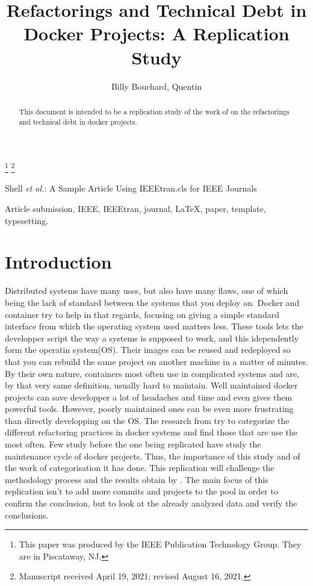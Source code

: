 \documentclass[lettersize,journal]{IEEEtran}
\begin{document}
\title{Refactorings and Technical Debt in Docker Projects: A Replication Study}

\author{Billy Bouchard, Quentin }
\thanks{This paper was produced by the IEEE Publication Technology Group. They are in Piscataway, NJ.}%
\thanks{Manuscript received April 19, 2021; revised August 16, 2021.}

%
{Shell \MakeLowercase{\textit{et al.}}: A Sample Article Using IEEEtran.cls for IEEE Journals}

\maketitle

\begin{abstract}
This document is intended to be a replication study of the work of \cite{1} on the refactorings and technical debt in docker projects.
\end{abstract}

\begin{IEEEkeywords}
Article submission, IEEE, IEEEtran, journal, \LaTeX, paper, template, typesetting.
\end{IEEEkeywords}

\section{Introduction}
Distributed systems have many uses, but also have many flaws, one of which being the lack of standard between the systems that you deploy on.
Docker and container try to help in that regards, focusing on giving a simple standard interface from which the operating system used matters less.
These tools lets the developper script the way a systems is supposed to work, and this idependently form the operatin system(OS).
Their images can be reused and redeployed so that you can rebuild the same project on another machine in a matter of minutes.
By their own nature, containers most often use in complicated systems and are, by that very same definition, usually hard to maintain.
Well maintained docker projects can save developper a lot of headaches and time and even gives them powerful tools.
However, poorly maintained ones can be even more frustrating than directly developping on the OS.
The research from \cite{1} try to categorize the different refactoring practices in docker systems and find those that are use the most often.
Few study before the one being replicated have study the maintenance cycle of docker projects.
Thus, the importance of this study and of the work of categorisation it has done.
This replication will challenge the methodology process and the results obtain by \cite{1}.
The main focus of this replication isn't to add more commits and projects to the pool in order to confirm the conclusion, but to look at the already analyzed data and verify the conclusions. 
\end{document}
